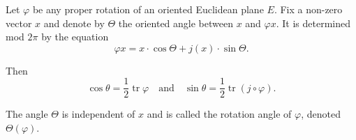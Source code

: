 Let $\varphi$ be any proper rotation of an oriented Euclidean plane $E$. Fix a non-zero vector $x$ and denote by $\Theta$ the oriented angle between $x$ and $\varphi x$. It is determined mod $2\pi$ by the equation
$$\varphi x = x \cdot \cos \Theta + j(x) \cdot \sin \Theta.$$

Then
$$\cos \theta = \frac{1}{2} \operatorname{tr} \varphi \quad \text{and} \quad \sin \theta = \frac{1}{2} \operatorname{tr} (j \circ \varphi).$$

The angle $\Theta$ is independent of $x$ and is called the rotation angle of $\varphi$, denoted $\Theta(\varphi)$.
